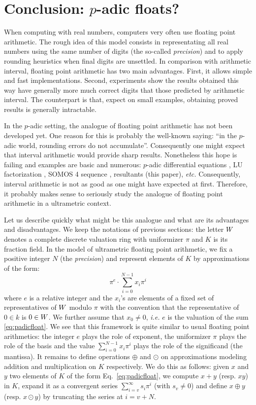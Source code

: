 \documentclass{article}
\begin{document}
\section{Conclusion: $p$-adic floats?}

When computing with real numbers, computers very often use floating 
point arithmetic. 
The rough idea of this model consists in representating all real numbers 
using the same number of digits (the so-called \emph{precision}) and to
apply rounding heuristics when final digits are unsettled.
In comparison with arithmetic interval, floating point arithmetic has
two main advantages. First, it allows simple and fast implementations.
Second, experiments show the results obtained this way have generally
more much correct digits that those predicted by arithmetic interval.
The counterpart is that, expect on small examples, obtaining proved
results is generally intractable.

In the $p$-adic setting, the analogue of floating point arithmetic has 
not been developed yet. One reason for this is probably the well-known 
saying: ``in the $p$-adic world, rounding errors do not accumulate''. 
Consequently one might expect that interval arithmetic would provide 
sharp results. Nonetheless this hope is failing and examples are basic 
and numerous: $p$-adic differential equations \cite{bostan, padicdiff}, 
LU factorization \cite{LU}, SOMOS 4 sequence \cite{padicprec}, 
resultants (this paper), \emph{etc.} Consequently, interval arithmetic 
is not as good as one might have expected at first. Therefore, it 
probably makes sense to seriously study the analogue of floating point 
arithmetic in a ultrametric context.

Let us describe quickly what might be this analogue and what are its
advantages and disadvantages. We keep the notations of previous
sections: the letter $W$ denotes a complete discrete valuation ring
with uniformizer $\pi$ and $K$ is its fraction field.
In the model of ultrametric floating point arithmetic, we fix a
positive integer $N$ (the \emph{precision}) and represent elements 
of $K$ by approximations of the form:
\begin{equation}
\label{eq:padicfloat}
\pi^e \cdot \sum_{i=0}^{N-1} x_i \pi^i
\end{equation}
where $e$ is a relative integer and the $x_i$'s are elements of a fixed 
set of representatives of $W$ modulo $\pi$ with the convention that the 
representative of $0 \in k$ is $0 \in W$.
We further assume that $x_0 \neq 0$, \emph{i.e.} $e$ is the valuation
of the sum \eqref{eq:padicfloat}. We see that this framework is quite
similar to usual floating point arithmetics: the integer $e$ plays the
role of exponent, the uniformizer $\pi$ plays the role of the basis
and the value $\sum_{i=0}^{N-1} x_i \pi^i$ plays the role of the
significand (the mantissa). It remains to define operations $\oplus$
and $\odot$ on approximations modeling addition and multiplication
on $K$ respectively. We do this as follows: given $x$ and $y$ two
elements of $K$ of the form Eq.~\eqref{eq:padicfloat}, we compute
$x+y$ (resp. $xy$) in $K$, expand it as a convergent series 
$\sum_{i=v}^{\infty} s_i \pi^i$ (with $s_v \neq 0$) and define $x 
\oplus y$ (resp. $x \odot y$) by truncating the series at $i = v+N$.
\end{document}
